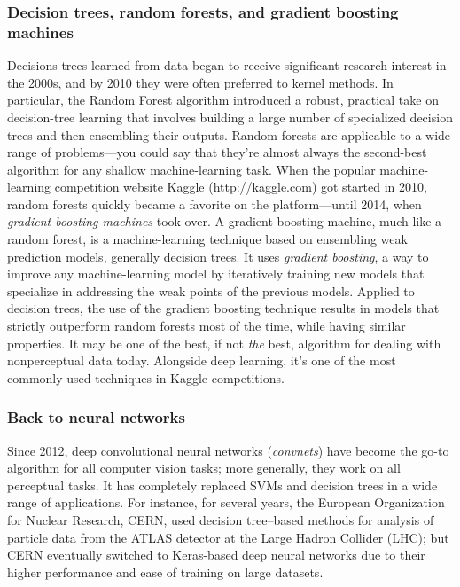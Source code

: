 \documentclass{article}
\numberwithin{equation}{section} %
\begin{document}
\subsubsection{Decision trees, random forests, and gradient boosting machines}

Decisions trees learned from data began to receive significant research interest
in the 2000s, and by 2010 they were often preferred to kernel methods. In particular, the Random Forest algorithm introduced a robust, practical take on
decision-tree learning that involves building a large number of specialized decision
trees and then ensembling their outputs. Random forests are applicable to a wide
range of problems—you could say that they’re almost always the second-best algorithm
for any shallow machine-learning task. When the popular machine-learning competition website Kaggle (http://kaggle.com) got started in 2010, random forests quickly became a favorite on the platform—until 2014, when \textit{gradient boosting machines} took over. A gradient boosting machine, much like a random forest, is a machine-learning technique based on ensembling weak prediction models, generally decision trees. It uses \textit{gradient boosting}, a way to improve any machine-learning model by iteratively training new models that specialize in addressing the weak points of the previous models. Applied to decision trees, the use of the gradient boosting technique results in models that strictly outperform random forests most of the time, while having similar properties. It may be one of the best, if not \textit{the} best, algorithm for dealing with nonperceptual data today. Alongside deep learning, it’s one of the most commonly used techniques in Kaggle competitions. \\

\subsubsection{Back to neural networks}

Since 2012, deep convolutional neural networks (\textit{convnets}) have become the go-to algorithm for all computer vision tasks; more generally, they work on all perceptual tasks.  It has completely replaced SVMs and decision trees in a
wide range of applications. For instance, for several years, the European Organization for Nuclear Research, CERN, used decision tree–based methods for analysis of particle data from the ATLAS detector at the Large Hadron Collider (LHC); but CERN eventually switched to Keras-based deep neural networks due to their higher performance and ease of training on large datasets. \\
\end{document}
